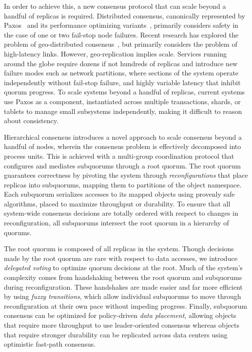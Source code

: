 \documentclass[10pt,conference]{IEEEtran}
\newcommand{\Hc}{Hierarchical consensus\xspace}
\newcommand{\sub}{subquorum\xspace}
\newcommand{\subs}{subquorums\xspace}
\newcommand{\roo}{root quorum\xspace}
\begin{document}
In order to achieve this, a new consensus protocol that can scale beyond a handful of
replicas is required.
Distributed consensus, canonically represented by Paxos~\cite{paxos_simple} and its
performance optimizing
variants~\cite{fast_paxos,multicoordinated_paxos,spaxos,generalized_paxos}, primarily
considers safety in the case of one or two fail-stop node failures.
Recent research has explored the problem of geo-distributed
consensus~\cite{mencius,epaxos}, but primarily considers the problem of high-latency
links.
However, geo-replication implies scale.
Services running around the globe require dozens if not hundreds of replicas and
introduce new failure modes such as network partitions, where sections of the system
operate independently without fail-stop failure, and highly variable latency that
inhibit quorum progress.
To scale systems beyond a handful of replicas, current
systems~\cite{spanner,scatter,mdcc,calvinfs} use Paxos as a component, instantiated
across multiple transactions, shards, or tablets to manage small subsystems
independently, making it difficult to reason about consistency.

\Hc introduces a novel approach to scale consensus beyond a handful of nodes, wherein
the consensus problem is effectively decomposed into process units.
This is achieved with a multi-group coordination protocol that configures and
mediates \subs through a \roo.
The \roo guarantees correctness by pivoting the system through \emph{reconfigurations}
that place replicas into \subs, mapping them to partitions of the object namespace.
Each \sub serializes accesses to its mapped objects using provenly safe algorithms,
placed to maximize throughput or durability.
To ensure that all system-wide consensus decisions are totally ordered with respect to
changes in reconfiguration, all \subs intersect the \roo in a hierarchy of quorums.

The \roo is composed of all replicas in the system.
Though decisions made by the \roo are rare with respect to data accesses, we introduce
\emph{delegated voting} to optimize quorum decisions at the root.
Much of the system's complexity comes from handshaking between the \roo and \subs during
reconfiguration.
These handshakes are made easier and far more efficient by using \emph{fuzzy transitions},
which allow individual \subs to move through reconfiguration at their own pace without
impeding progress.
Finally, subquorum consensus can be optimized for policy-driven \emph{data placement},
allowing objects that require more throughput to use leader-oriented consensus whereas
objects that require stronger durability can be replicated across data centers using
optimistic fast-path consensus.
\end{document}
